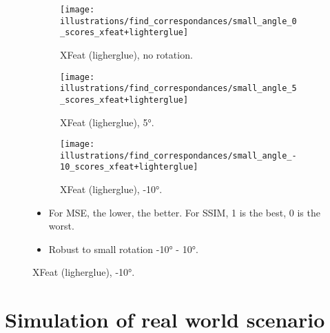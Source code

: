 \documentclass[aspectratio=169,hyperref={pdfpagelabels=false}]{beamer}
\begin{document}
    \begin{frame}
        \begin{figure}[ht!]
            \centering
            \begin{subfigure}[t]{0.32\textwidth}
                \texttt{[image: illustrations/find\_correspondances/small\_angle\_0\_scores\_xfeat+lighterglue]}
                \caption{XFeat (ligherglue), no rotation.}
                \label{fig:find_corr:small_angles:mse_ssim_xfeat+lg_0}
            \end{subfigure}
            \hfill
            \begin{subfigure}[t]{0.32\textwidth}
                \texttt{[image: illustrations/find\_correspondances/small\_angle\_5\_scores\_xfeat+lighterglue]}
                \caption{XFeat (ligherglue), 5°.}
                \label{fig:find_corr:small_angles:mse_ssim_xfeat+lg_5}
            \end{subfigure}
            \hfill
            \begin{subfigure}[t]{0.32\textwidth}
                \texttt{[image: illustrations/find\_correspondances/small\_angle\_-10\_scores\_xfeat+lighterglue]}
                \caption{XFeat (ligherglue), -10°.}
                \label{fig:find_corr:small_angles:mse_ssim_xfeat+lg_-10}
            \end{subfigure}

            \begin{itemize}
                \item For MSE, the lower, the better. For SSIM, 1 is the best, 0 is the worst.
                \item Robust to small rotation -10° - 10°.
            \end{itemize}
        \end{figure}
    \end{frame}
%
%


    \section{Simulation of real world scenario}
    \begin{frame}[tocremainder]
        \tableofcontents[currentsection]
    \end{frame}
\end{document}

